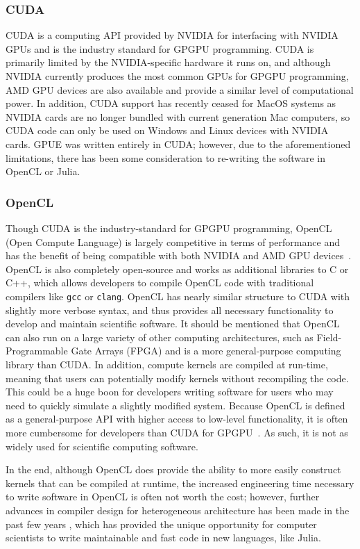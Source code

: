 \subsubsection{CUDA}
CUDA is a computing API provided by NVIDIA for interfacing with NVIDIA GPUs and is the industry standard for GPGPU programming.
CUDA is primarily limited by the NVIDIA-specific hardware it runs on, and although NVIDIA currently produces the most common GPUs for GPGPU programming, AMD GPU devices are also available and provide a similar level of computational power.
In addition, CUDA support has recently ceased for MacOS systems as NVIDIA cards are no longer bundled with current generation Mac computers, so CUDA code can only be used on Windows and Linux devices with NVIDIA cards.
GPUE was written entirely in CUDA; however, due to the aforementioned limitations, there has been some consideration to re-writing the software in OpenCL or Julia.

\subsubsection{OpenCL}

Though CUDA is the industry-standard for GPGPU programming, OpenCL (Open Compute Language) is largely competitive in terms of performance and has the benefit of being compatible with both NVIDIA and AMD GPU devices~\cite{opencl, fang2011}.
OpenCL is also completely open-source and works as additional libraries to C or C++, which allows developers to compile OpenCL code with traditional compilers like \texttt{gcc} or \texttt{clang}.
OpenCL has nearly similar structure to CUDA with slightly more verbose syntax, and thus provides all necessary functionality to develop and maintain scientific software.
It should be mentioned that OpenCL can also run on a large variety of other computing architectures, such as Field-Programmable Gate Arrays (FPGA) and is a more general-purpose computing library than CUDA.
In addition, compute kernels are compiled at run-time, meaning that users can potentially modify kernels without recompiling the code.
This could be a huge boon for developers writing software for users who may need to quickly simulate a slightly modified system.
Because OpenCL is defined as a general-purpose API with higher access to low-level functionality, it is often more cumbersome for developers than CUDA for GPGPU~\cite{komatsu2010}.
As such, it is not as widely used for scientific computing software.

In the end, although OpenCL does provide the ability to more easily construct kernels that can be compiled at runtime, the increased engineering time necessary to write software in OpenCL is often not worth the cost; however, further advances in compiler design for heterogeneous architecture has been made in the past few years \cite{besard2019}, which has provided the unique opportunity for computer scientists to write maintainable and fast code in new languages, like Julia.


